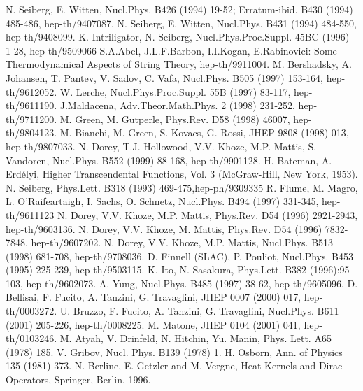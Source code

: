 \documentclass[a4paper,12pt]{article}
\begin{document}
\begin{thebibliography}{99}
N. Seiberg, E. Witten, Nucl.Phys. B426 (1994) 19-52; 
Erratum-ibid. B430 (1994) 485-486, hep-th/9407087. 
 N. Seiberg, E. Witten, Nucl.Phys. B431 (1994) 484-550,
hep-th/9408099. 
K. Intriligator, N. Seiberg, 
Nucl.Phys.Proc.Suppl. 45BC (1996) 1-28, hep-th/9509066
S.A.Abel, J.L.F.Barbon, I.I.Kogan, E.Rabinovici:
Some Thermodynamical Aspects of String Theory, hep-th/9911004.
M. Bershadsky, A. Johansen, T. Pantev, V. Sadov, C. Vafa, 
Nucl.Phys. B505 (1997) 153-164, hep-th/9612052. 
W. Lerche, Nucl.Phys.Proc.Suppl. 55B (1997) 83-117, 
hep-th/9611190.
J.Maldacena, Adv.Theor.Math.Phys. 2 (1998) 231-252, 
hep-th/9711200.
M. Green, M. Gutperle, Phys.Rev. D58 (1998) 46007, 
hep-th/9804123.
M. Bianchi, M. Green, S. Kovacs, G. Rossi, 
JHEP 9808 (1998) 013, hep-th/9807033. 
 N. Dorey, T.J. Hollowood, V.V. Khoze, M.P. Mattis, 
S. Vandoren, Nucl.Phys. B552 (1999) 88-168, hep-th/9901128.
H. Bateman, A. Erd\'{e}lyi, Higher Transcendental 
Functions, Vol. 3 (McGraw-Hill, New York, 1953).
N. Seiberg, Phys.Lett. B318 (1993) 469-475,hep-ph/9309335  
 R. Flume, M. Magro, L. O'Raifeartaigh, I. Sachs, O. Schnetz, 
Nucl.Phys. B494 (1997) 331-345, hep-th/9611123 
N. Dorey, V.V. Khoze, M.P. Mattis, 
Phys.Rev. D54 (1996) 2921-2943, hep-th/9603136.
N. Dorey, V.V. Khoze, M. Mattis, 
Phys.Rev. D54 (1996) 7832-7848, hep-th/9607202. 
N. Dorey, V.V. Khoze, M.P. Mattis, 
Nucl.Phys. B513 (1998) 681-708, hep-th/9708036.
D. Finnell (SLAC), P. Pouliot, Nucl.Phys. B453 (1995) 225-239, 
hep-th/9503115. 
K. Ito, N. Sasakura, Phys.Lett. B382 (1996):95-103, 
hep-th/9602073.
 A. Yung, Nucl.Phys. B485 (1997) 38-62,  hep-th/9605096. 
 D. Bellisai, F. Fucito, A. Tanzini, G. Travaglini, 
JHEP 0007 (2000) 017, hep-th/0003272.
 U. Bruzzo, F. Fucito, A. Tanzini, G. Travaglini, 
Nucl.Phys. B611 (2001) 205-226, hep-th/0008225. 
M. Matone, JHEP 0104 (2001) 041, hep-th/0103246. 
M. Atyah, V. Drinfeld, N. Hitchin, Yu. Manin, 
Phys. Lett. A65 (1978) 185. 
V. Gribov, Nucl. Phys. B139 (1978) 1.
H. Osborn, Ann. of Physics 135 (1981) 373. 
N. Berline, E. Getzler and M. Vergne, 
Heat Kernels and Dirac Operators, Springer, Berlin, 1996. 

\end{thebibliography}
\end{document}
